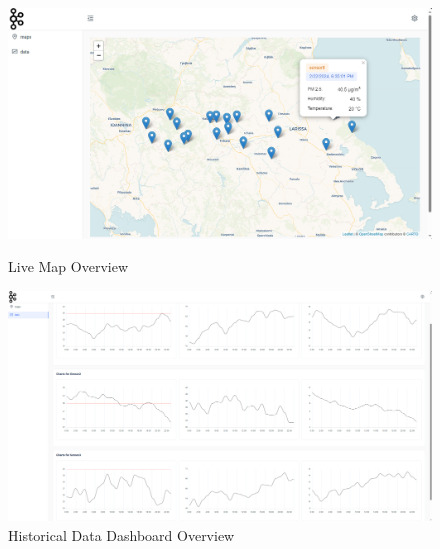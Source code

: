 \begin{figure}[htbp]
    \centering
    \includegraphics[width=1\linewidth]{figures/Screenshot 2024-02-22 183525.png}
    \caption{Live Map Overview}
    \label{ReactMap1}
    
    \vspace{2.5cm} %
    
    \includegraphics[width=1\linewidth]{figures/Screenshot 2024-02-22 183833.png}
    \caption{Historical Data Dashboard Overview}
    \label{ReactMap2}
\end{figure}